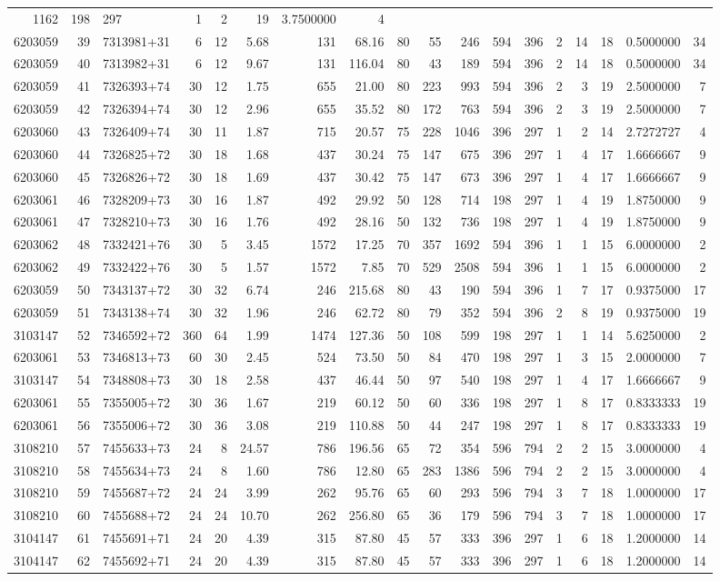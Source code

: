 \documentclass[
]{article}
\begin{document}
\begin{longtable}[]{@{}rrlrrrrrrrrrrrrrrr@{}}
1162 & 198 & 297 & 1 & 2 & 19 & 3.7500000 & 4\tabularnewline
6203059 & 39 & 7313981+31 & 6 & 12 & 5.68 & 131 & 68.16 & 80 & 55 & 246
& 594 & 396 & 2 & 14 & 18 & 0.5000000 & 34\tabularnewline
6203059 & 40 & 7313982+31 & 6 & 12 & 9.67 & 131 & 116.04 & 80 & 43 & 189
& 594 & 396 & 2 & 14 & 18 & 0.5000000 & 34\tabularnewline
6203059 & 41 & 7326393+74 & 30 & 12 & 1.75 & 655 & 21.00 & 80 & 223 &
993 & 594 & 396 & 2 & 3 & 19 & 2.5000000 & 7\tabularnewline
6203059 & 42 & 7326394+74 & 30 & 12 & 2.96 & 655 & 35.52 & 80 & 172 &
763 & 594 & 396 & 2 & 3 & 19 & 2.5000000 & 7\tabularnewline
6203060 & 43 & 7326409+74 & 30 & 11 & 1.87 & 715 & 20.57 & 75 & 228 &
1046 & 396 & 297 & 1 & 2 & 14 & 2.7272727 & 4\tabularnewline
6203060 & 44 & 7326825+72 & 30 & 18 & 1.68 & 437 & 30.24 & 75 & 147 &
675 & 396 & 297 & 1 & 4 & 17 & 1.6666667 & 9\tabularnewline
6203060 & 45 & 7326826+72 & 30 & 18 & 1.69 & 437 & 30.42 & 75 & 147 &
673 & 396 & 297 & 1 & 4 & 17 & 1.6666667 & 9\tabularnewline
6203061 & 46 & 7328209+73 & 30 & 16 & 1.87 & 492 & 29.92 & 50 & 128 &
714 & 198 & 297 & 1 & 4 & 19 & 1.8750000 & 9\tabularnewline
6203061 & 47 & 7328210+73 & 30 & 16 & 1.76 & 492 & 28.16 & 50 & 132 &
736 & 198 & 297 & 1 & 4 & 19 & 1.8750000 & 9\tabularnewline
6203062 & 48 & 7332421+76 & 30 & 5 & 3.45 & 1572 & 17.25 & 70 & 357 &
1692 & 594 & 396 & 1 & 1 & 15 & 6.0000000 & 2\tabularnewline
6203062 & 49 & 7332422+76 & 30 & 5 & 1.57 & 1572 & 7.85 & 70 & 529 &
2508 & 594 & 396 & 1 & 1 & 15 & 6.0000000 & 2\tabularnewline
6203059 & 50 & 7343137+72 & 30 & 32 & 6.74 & 246 & 215.68 & 80 & 43 &
190 & 594 & 396 & 1 & 7 & 17 & 0.9375000 & 17\tabularnewline
6203059 & 51 & 7343138+74 & 30 & 32 & 1.96 & 246 & 62.72 & 80 & 79 & 352
& 594 & 396 & 2 & 8 & 19 & 0.9375000 & 19\tabularnewline
3103147 & 52 & 7346592+72 & 360 & 64 & 1.99 & 1474 & 127.36 & 50 & 108 &
599 & 198 & 297 & 1 & 1 & 14 & 5.6250000 & 2\tabularnewline
6203061 & 53 & 7346813+73 & 60 & 30 & 2.45 & 524 & 73.50 & 50 & 84 & 470
& 198 & 297 & 1 & 3 & 15 & 2.0000000 & 7\tabularnewline
3103147 & 54 & 7348808+73 & 30 & 18 & 2.58 & 437 & 46.44 & 50 & 97 & 540
& 198 & 297 & 1 & 4 & 17 & 1.6666667 & 9\tabularnewline
6203061 & 55 & 7355005+72 & 30 & 36 & 1.67 & 219 & 60.12 & 50 & 60 & 336
& 198 & 297 & 1 & 8 & 17 & 0.8333333 & 19\tabularnewline
6203061 & 56 & 7355006+72 & 30 & 36 & 3.08 & 219 & 110.88 & 50 & 44 &
247 & 198 & 297 & 1 & 8 & 17 & 0.8333333 & 19\tabularnewline
3108210 & 57 & 7455633+73 & 24 & 8 & 24.57 & 786 & 196.56 & 65 & 72 &
354 & 596 & 794 & 2 & 2 & 15 & 3.0000000 & 4\tabularnewline
3108210 & 58 & 7455634+73 & 24 & 8 & 1.60 & 786 & 12.80 & 65 & 283 &
1386 & 596 & 794 & 2 & 2 & 15 & 3.0000000 & 4\tabularnewline
3108210 & 59 & 7455687+72 & 24 & 24 & 3.99 & 262 & 95.76 & 65 & 60 & 293
& 596 & 794 & 3 & 7 & 18 & 1.0000000 & 17\tabularnewline
3108210 & 60 & 7455688+72 & 24 & 24 & 10.70 & 262 & 256.80 & 65 & 36 &
179 & 596 & 794 & 3 & 7 & 18 & 1.0000000 & 17\tabularnewline
3104147 & 61 & 7455691+71 & 24 & 20 & 4.39 & 315 & 87.80 & 45 & 57 & 333
& 396 & 297 & 1 & 6 & 18 & 1.2000000 & 14\tabularnewline
3104147 & 62 & 7455692+71 & 24 & 20 & 4.39 & 315 & 87.80 & 45 & 57 & 333
& 396 & 297 & 1 & 6 & 18 & 1.2000000 & 14\tabularnewline
\bottomrule
\end{longtable}
\end{document}

